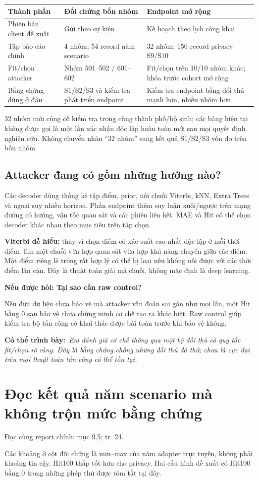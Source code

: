\documentclass[10pt,a4paper]{article}
\newcommand{\say}[1]{\par\textbf{Có thể trình bày:}\ \textit{#1}\par}
\newcommand{\ask}[2]{\par\textbf{Nếu được hỏi: #1}\par #2\par}
\newcommand{\where}[1]{\par{\small\color{gray}Đọc cùng report chính: #1.}\par}
\newcommand{\guidepage}[1]{\clearpage\section{#1}}
\begin{document}
\begin{longtable}{@{}P{4.0cm}P{6.0cm}P{6.2cm}@{}}
\toprule Thành phần & Đối chứng bốn nhóm & Endpoint mở rộng\\\midrule
Phiên bản client đề xuất & Gửi theo sự kiện & Kế hoạch theo lịch công khai\\[4pt]
Tập báo cáo chính & 4 nhóm; 54 record năm scenario & 32 nhóm; 150 record privacy S9/S10\\[4pt]
Fit/chọn attacker & Nhóm 501--502 / 601--602 & Fit/chọn trên 10/10 nhóm khác; khóa trước cohort mở rộng\\[4pt]
Bằng chứng dùng ở đâu & S1/S2/S3 và kiểm tra phát triển endpoint & Kiểm tra endpoint bằng đối thủ mạnh hơn, nhiều nhóm hơn\\
\bottomrule
\end{longtable}
32 nhóm mới củng cố kiểm tra trong cùng thành phố/bộ sinh; các bảng hiện tại không được gọi là một lần xác nhận độc lập hoàn toàn mới sau mọi quyết định nghiên cứu. Không chuyển nhãn ``32 nhóm'' sang kết quả S1/S2/S3 vốn đo trên bốn nhóm.

\subsection*{Attacker đang có gồm những hướng nào?}
Các decoder dùng thống kê tập điểm, prior, nối chuỗi Viterbi, kNN, Extra Trees và ngoại suy nhiều horizon. Phần endpoint thêm suy luận xuôi/ngược trên mạng đường có hướng, vận tốc quan sát và các phiên liên kết. MAE và Hit có thể chọn decoder khác nhau theo mục tiêu trên tập chọn.

\textbf{Viterbi dễ hiểu:} thay vì chọn điểm có xác suất cao nhất độc lập ở mỗi thời điểm, tìm một chuỗi vừa hợp quan sát vừa hợp khả năng chuyển giữa các điểm. Một điểm riêng lẻ trông rất hợp lý có thể bị loại nếu không nối được với các thời điểm lân cận. Đây là thuật toán giải mã chuỗi, không mặc định là deep learning.

\ask{Tại sao cần raw control?}{Nếu đưa dữ liệu chưa bảo vệ mà attacker vẫn đoán sai gần như mọi lần, một Hit bằng 0 sau bảo vệ chưa chứng minh cơ chế tạo ra khác biệt. Raw control giúp kiểm tra bộ tấn công có khai thác được bài toán trước khi bảo vệ không.}
\say{Em đánh giá cơ chế thông qua một bộ đối thủ có quy tắc fit/chọn rõ ràng. Đây là bằng chứng chống những đối thủ đã thử; chưa là cực đại trên mọi thuật toán tấn công có thể tồn tại.}

\guidepage{Đọc kết quả năm scenario mà không trộn mức bằng chứng}
\where{mục 9.5; tr. 24}
\PrivacyEvidence
Các khoảng ở cột đối chứng là min--max của năm adapter trực tuyến, không phải khoảng tin cậy. Hit100 thấp tốt hơn cho privacy. Hai cấu hình đề xuất có Hit100 bằng 0 trong những phép thử được tóm tắt tại đây.
\end{document}
